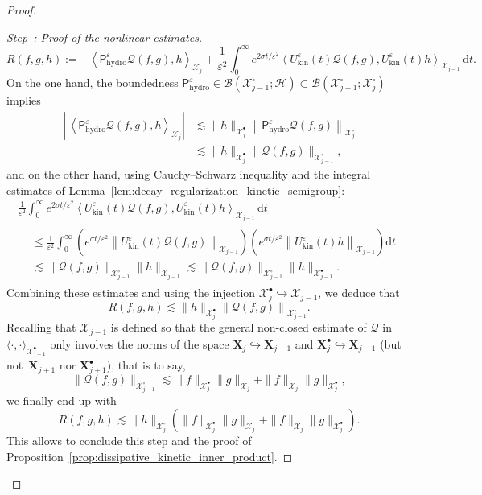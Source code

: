 \documentclass[AHL,Unicode,longabstracts,published]{cedram}
\newcommand{\hyd}{\mathrm{hydro}}
\newcommand{\kin}{\mathrm{kin}}
\renewcommand{\d}{\mathrm{d}}
\newcommand{\XX}{\mathcal{X}}
\newcommand{\HH}{\mathcal{H}}
\newcommand{\PP}{\mathsf{P}}
\newcommand{\QQ}{\mathcal{Q}}
\newcommand{\BBB}{\mathscr{B}}
\newcommand{\SSs}{\HH}
\newcommand{\Sh}{\bm{X}}
\newcommand{\Shp}{\bm{X}^{\bullet}}
\newcommand{\SSh}{\bm{\XX}}
\newcommand{\SShp}{\bm{\XX}^{\bullet}}
\newcommand{\SShm}{\bm{\XX}^{\circ}}
\renewcommand*\le{\leqslant}
\newcommand*\eps{{\varepsilon}}
\newcommand{\la}{\langle}
\newcommand{\ra}{\rangle}
\newcounter{stepcount}
\newenvironment{step}[1]{\refstepcounter{stepcount}\begin{proof}[Step~\thestepcount: #1]}{\let\qed\relax\end{proof}}
\begin{document}
\begin{proof}
\begin{step}{{Proof of the nonlinear estimates}}
\[
R(f, g, h) := - \left\la \PP^\eps_\hyd \QQ(f, g), h \right\ra_{\SSh_j } + \frac{1}{\eps^2} \int_0^\infty e^{2 \sigma t / \eps^2} \left\la U^\eps_\kin(t) \QQ(f, g), U^\eps_\kin(t) h \right\ra_{ \SSh_{j-1}} \, \d t.
\]
On the one hand, the boundedness $\PP^\eps_\hyd \in \BBB(\SShm_{j-1} ; \SSs) \subset \BBB(\SShm_{j-1} ;\SShm_{j})$ implies
\begin{align*}
\left|\, \left\la \PP^\eps_\hyd \QQ(f, g), h \right\ra_{\SSh_j} \right| & \lesssim \| h \|_{\SShp_{j} } \left\| \PP^\eps_\hyd \QQ(f, g) \right\|_{ \SShm_{j}} \\
& \lesssim \| h \|_{ \SShp_{j}} \| \QQ(f, g) \|_{ \SShm_{j-1}},
\end{align*}
and on the other hand, using Cauchy--Schwarz inequality and the integral estimates of Lemma~\ref{lem:decay_regularization_kinetic_semigroup}:
\begin{multline*}
\frac{1}{\eps^2} \int_0^\infty e^{2 \sigma t / \eps^2 } \left\la U^\eps_\kin(t) \QQ(f, g), U^\eps_\kin(t) h \right\ra_{ \SSh_{j-1}} \, \d t \\
\begin{aligned}
& \le \frac{1}{\eps^2} \int_0^\infty \left(e^{\sigma t / \eps^2} \left\| U^\eps_\kin(t) \QQ(f, g) \right\|_{ \SSh_{j-1}} \right) \left(e^{\sigma t / \eps^2} \left\| U^\eps_\kin(t) h \right\|_{ \SSh_{j-1}} \right) \d t \\
& \lesssim \| \QQ(f, g) \|_{ \SShm_{j-1}} \| h \|_{ \SSh_{j-1} } \lesssim \| \QQ(f, g) \|_{ \SShm_{j-1} } \| h \|_{ \SShp_{j-1} }.
\end{aligned}
\end{multline*}
Combining these estimates and using the injection $ \SShp_{j}\hookrightarrow \SSh_{j-1}$, we deduce that
\[
R(f, g, h) \lesssim \| h \|_{ \SShp_{j} } \left\| \QQ(f, g) \right\|_{ \SShm_{j-1} }.
\]
Recalling that $ \SSh_{j-1}$ is defined so that the general non-closed estimate of $\QQ$ in $\la \cdot, \cdot \ra_{\SShp_{j-1} }$ only involves the norms of the space $ \Sh_{j} \hookrightarrow \Sh_{j-1}$ and $\Shp_{j} \hookrightarrow \Sh_{j-1}$ (but not~$\Sh_{j+1}$ nor $\Shp_{j+1}$), that is to say,
\[
\| \QQ(f, g) \|_{ \SShm_{j-1} } \lesssim \| f \|_{ \SShp_{j} } \| g \|_{ \SSh_j} + \| f \|_{ \SSh_j} \| g \|_{ \SShp_{j}},
\]
we finally end up with
\[
R(f, g, h) \lesssim \| h \|_{ \SShm_{j} } \left(\| f \|_{ \SShp_{j} } \| g \|_{ \SSh_j} + \| f \|_{ \SSh_j } \| g \|_{ \SShp_{j} } \right).
\]
This allows to conclude this step and the proof of  Proposition~\ref{prop:dissipative_kinetic_inner_product}.\qedhere
\end{step}\let\qed\relax
\end{proof}
\end{document}
